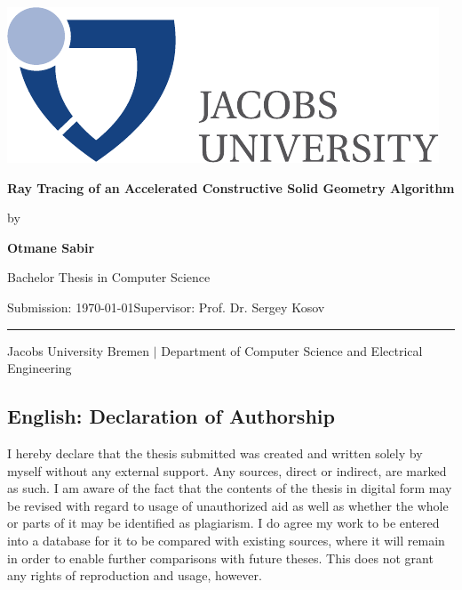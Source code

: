 \documentclass[a4paper,11pt,oneside]{article}
\newcommand{\myname}{Otmane Sabir}
\newcommand{\mytitle}{Ray Tracing of an Accelerated Constructive Solid Geometry Algorithm }
\newcommand{\mysupervisor}{Prof. Dr. Sergey Kosov}
\begin{document}

\thispagestyle{empty}

\begin{flushright}
	\includegraphics[scale=0.8]{bsc-logo}
\end{flushright}
\vspace*{40mm}
\begin{center}
	\huge
	\textbf{\mytitle}
\end{center}
\vspace*{4mm}
\begin{center}
	\Large by
\end{center}
\vspace*{4mm}
\begin{center}
	\LARGE
	\textbf{\myname}
\end{center}
\vspace*{20mm}
\begin{center}
	\Large
	Bachelor Thesis in Computer Science
\end{center}
\vfill
\begin{flushleft}
	\large
	Submission: \today \hfill Supervisor: \mysupervisor \\
	\rule{\textwidth}{1pt}
\end{flushleft}
\begin{center}
	Jacobs University Bremen $|$ Department of Computer Science and Electrical Engineering
\end{center}

\newpage
\thispagestyle{empty}

\subsection*{English: Declaration of Authorship}
 
I hereby declare that the thesis submitted was created and written
solely by myself without any external support. Any sources, direct
or indirect, are marked as such. I am aware of the fact that the
contents of the thesis in digital form may be revised with regard to
usage of unauthorized aid as well as whether the whole or parts of
it may be identified as plagiarism. I do agree my work to be entered
into a database for it to be compared with existing sources, where
it will remain in order to enable further comparisons with future
theses. This does not grant any rights of reproduction and usage,
however.
\end{document}
